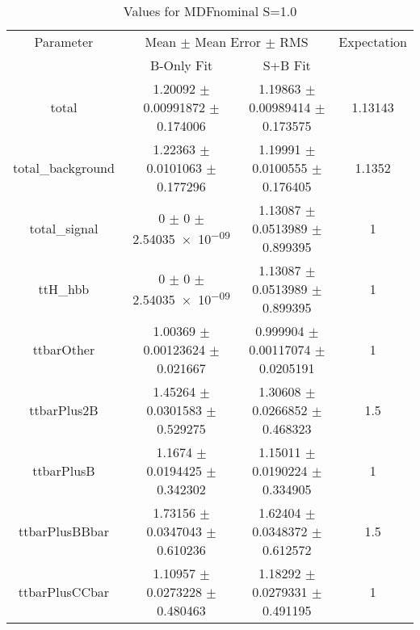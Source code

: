 \begin{table}
\centering
\caption{Values for MDFnominal S=1.0}
\begin{tabular}{cccc}
\toprule
Parameter & \multicolumn{2}{c}{Mean $\pm$ Mean Error $\pm$ RMS} & Expectation\\
 & B-Only Fit & S+B Fit & \\
\midrule
total & \num{1.20092} $\pm$ \num{0.00991872} $\pm$ \num{0.174006} & \num{1.19863} $\pm$ \num{0.00989414} $\pm$ \num{0.173575} & \num{1.13143}\\
total\_background & \num{1.22363} $\pm$ \num{0.0101063} $\pm$ \num{0.177296} & \num{1.19991} $\pm$ \num{0.0100555} $\pm$ \num{0.176405} & \num{1.1352}\\
total\_signal & \num{0} $\pm$ \num{0} $\pm$ \num{2.54035e-09} & \num{1.13087} $\pm$ \num{0.0513989} $\pm$ \num{0.899395} & \num{1}\\
ttH\_hbb & \num{0} $\pm$ \num{0} $\pm$ \num{2.54035e-09} & \num{1.13087} $\pm$ \num{0.0513989} $\pm$ \num{0.899395} & \num{1}\\
ttbarOther & \num{1.00369} $\pm$ \num{0.00123624} $\pm$ \num{0.021667} & \num{0.999904} $\pm$ \num{0.00117074} $\pm$ \num{0.0205191} & \num{1}\\
ttbarPlus2B & \num{1.45264} $\pm$ \num{0.0301583} $\pm$ \num{0.529275} & \num{1.30608} $\pm$ \num{0.0266852} $\pm$ \num{0.468323} & \num{1.5}\\
ttbarPlusB & \num{1.1674} $\pm$ \num{0.0194425} $\pm$ \num{0.342302} & \num{1.15011} $\pm$ \num{0.0190224} $\pm$ \num{0.334905} & \num{1}\\
ttbarPlusBBbar & \num{1.73156} $\pm$ \num{0.0347043} $\pm$ \num{0.610236} & \num{1.62404} $\pm$ \num{0.0348372} $\pm$ \num{0.612572} & \num{1.5}\\
ttbarPlusCCbar & \num{1.10957} $\pm$ \num{0.0273228} $\pm$ \num{0.480463} & \num{1.18292} $\pm$ \num{0.0279331} $\pm$ \num{0.491195} & \num{1}\\
\bottomrule
\end{tabular}
\end{table}